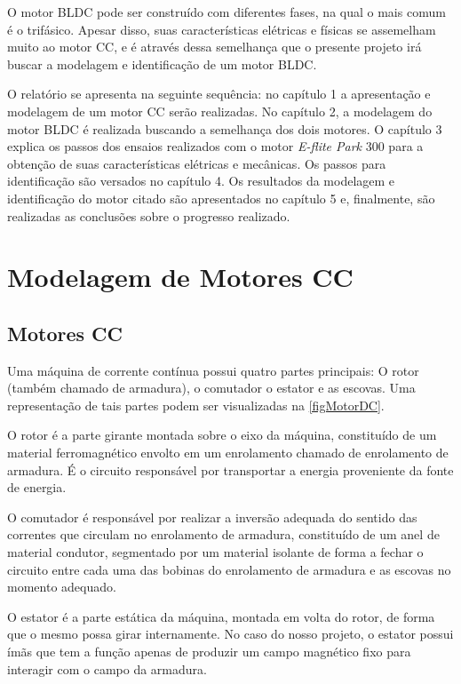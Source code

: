 \documentclass[
	12pt,				%
	openright,			%
	oneside,			%
	a4paper,			%
	english,			%
	french,				%
	spanish,			%
	brazil,				%
	]{abntex2}
\begin{document}
O motor BLDC pode ser construído com diferentes fases, na qual o mais comum é o trifásico. Apesar disso, suas características elétricas e físicas se assemelham muito ao motor CC, e é através dessa semelhança que o presente projeto irá buscar a modelagem e identificação de um motor BLDC.

O relatório se apresenta na seguinte sequência: no capítulo 1 a apresentação e modelagem de um motor CC serão realizadas. No capítulo 2, a modelagem do motor BLDC é realizada buscando a semelhança dos dois motores. O capítulo 3 explica os passos dos ensaios realizados com o motor \textit{E-flite Park} 300 para a obtenção de suas características elétricas e mecânicas. Os passos para identificação são versados no capítulo 4. Os resultados da modelagem e identificação do motor citado são apresentados no capítulo 5 e, finalmente, são realizadas as conclusões sobre o progresso realizado.

\chapter{Modelagem de Motores CC}

\section{Motores CC}

Uma máquina de corrente contínua possui quatro partes principais: O rotor (também chamado de armadura), o comutador o estator e as escovas. Uma representação de tais partes podem ser visualizadas na \autoref{figMotorDC}.

O rotor é a parte girante montada sobre o eixo da máquina, constituído de um material ferromagnético envolto em um enrolamento chamado de enrolamento de armadura. É o circuito responsável por transportar a energia proveniente da fonte de energia.

O comutador é responsável por realizar a inversão adequada do sentido das correntes que circulam no enrolamento de armadura, constituído de um anel de material condutor, segmentado por um material isolante de forma a fechar o circuito entre cada uma das bobinas do enrolamento de armadura e as escovas no momento adequado.

O estator é a parte estática da máquina, montada em volta do rotor, de forma que o mesmo possa girar internamente. No caso do nosso projeto, o estator possui ímãs que tem a função apenas de produzir um campo magnético fixo para interagir com o campo da armadura.
\end{document}
